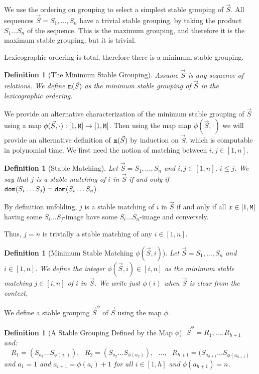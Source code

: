 \documentclass{lmcs}
\newtheorem{definition}[theorem]{Definition}
\begin{document}
We use the ordering on grouping to select a simplest stable grouping of $\vec{S}$.
All sequences $\vec{S}=S_1, \ldots, S_n$ have a trivial stable grouping, by taking the
product $S_1 \ldots S_n$ of the sequence. This is the maximum grouping, 
and therefore it is the maximum stable grouping, but it is trivial.

Lexicographic ordering is total, therefore there is a minimum stable grouping.

\begin{definition}[The Minimum Stable Grouping]
\label{definition-minstable}
Assume $\vec{S}$ is any sequence of relations. We define 
${\tt m}(\vec{S})$ as the minimum stable grouping of $\vec{S}$ in the
lexicographic ordering.
\end{definition}


We provide an alternative characterization of the minimum stable grouping of $\vec{S}$
using a map $\phi(\vec{S},\cdot) : [1,{\tt M}] \rightarrow  [1,{\tt M}]$. 
Then using the map  map $\phi(\vec{S},\cdot)$ we will provide an alternative definition of 
${\tt m}(\vec{S})$ by induction on $\vec{S}$, which is computable in polynomial time. 
We first need the notion of matching between $i,j \in [1,n]$.

\begin{definition}[Stable Matching]
Let $\vec{S} = S_1, \ldots, S_n$ and $i,j \in [1,n]$, $i \le j$.
We say that $j$ is a stable matching of $i$ in $\vec{S}$
if and only if ${\tt dom}(S_i \ldots S_j) = {\tt dom}(S_i \ldots S_n)$.
\end{definition}

By definition unfolding, $j$ is a stable matching of $i$ in $\vec{S}$
if and only if all $x \in [1,{\tt M}]$ having some $S_i \ldots S_j$-image have some
$S_i \ldots S_n$-image and conversely. 

Thus, $j=n$ is trivially a stable matching of any $i \in [1,n]$.

\begin{definition}[Minimum Stable Matching $\phi(\vec{S},i)$]
Let $\vec{S} = S_1, \ldots, S_n$ and $i \in [1,n]$.
We define the integer $\phi(\vec{S},i) \in [i,n]$ as the minimum stable matching $j\in [i,n]$ 
of $i$ in $\vec{S}$. We write just $\phi(i)$ when $\vec{S}$ is clear from the context,
\end{definition}

We define a stable grouping $\vec{S}^{\phi}$ of $\vec{S}$ using the map $\phi$.

\begin{definition} [A Stable Grouping Defined by the Map $\phi$]
$\vec{S}^{\phi}=R_1, \ldots, R_{h+1}$ and: 
$$
R_1 = (S_{a_1}\ldots S_{\phi(a_1)}), \ \ \ 
R_2 = (S_{a_2}\ldots S_{\phi(a_2)}), \ \ \ 
\ldots, \ \ \ 
R_{h+1} = (S_{a_{h+1}}\ldots S_{\phi(a_{h+1})}
$$ 
and $a_1=1$ and $a_{i+1} = \phi(a_i)+1$ 
for all $i \in [1,h]$ and $\phi(a_{h+1}) = n$. 
\end{definition}
\end{document}
